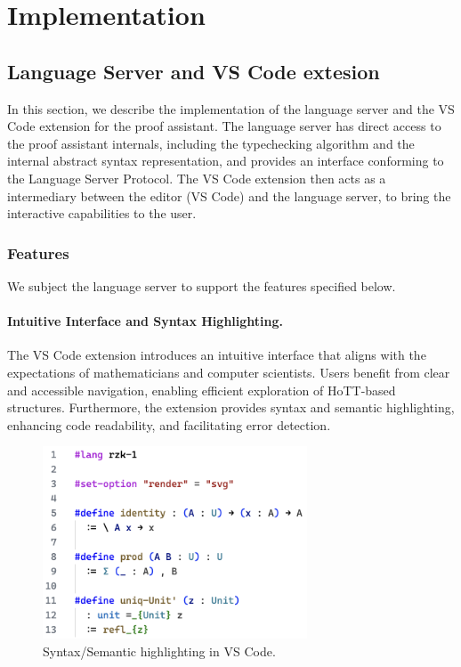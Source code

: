\chapter{Implementation}
\label{chap:impl}

\section{\Rzk{} Language Server and VS Code extesion}

In this section, we describe the implementation of the language server
and the VS Code extension for the \Rzk{} proof assistant.
The language server has direct access to the proof assistant internals,
including the typechecking algorithm and the internal abstract syntax representation,
and provides an interface conforming to the Language Server Protocol.
The VS Code extension then acts as a intermediary between the editor (VS Code)
and the language server, to bring the interactive capabilities to the user.

\subsection{Features}


We subject the language server to support the features specified below.

\subsubsection{Intuitive Interface and Syntax Highlighting.}

The VS Code extension introduces an intuitive interface that aligns with
the expectations of mathematicians and computer scientists.
Users benefit from clear and accessible navigation,
enabling efficient exploration of HoTT-based structures.
Furthermore, the extension provides syntax and semantic highlighting,
enhancing code readability, and facilitating error detection.

\begin{figure}
  \centering
  \includegraphics[width=0.7\textwidth]{figs/syntax-highlighting.png}
  \caption{Syntax/Semantic highlighting in VS Code.}
  \label{figure:syntax-highlighting}
\end{figure}

